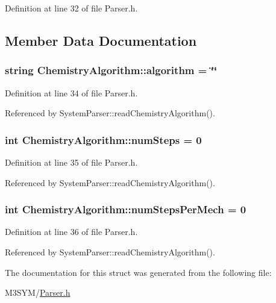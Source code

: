 Definition at line 32 of file Parser.\+h.



\subsection{Member Data Documentation}
\hypertarget{structChemistryAlgorithm_a79823d8025ebda7f40a0fa7683008ce2}{
\subsubsection[{algorithm}]{\setlength{\rightskip}{0pt plus 5cm}string Chemistry\+Algorithm\+::algorithm = \char`\"{}\char`\"{}}}\label{structChemistryAlgorithm_a79823d8025ebda7f40a0fa7683008ce2}


Definition at line 34 of file Parser.\+h.



Referenced by System\+Parser\+::read\+Chemistry\+Algorithm().

\hypertarget{structChemistryAlgorithm_a6ba1dded2edadb96427909fcead6cdeb}{
\subsubsection[{num\+Steps}]{\setlength{\rightskip}{0pt plus 5cm}int Chemistry\+Algorithm\+::num\+Steps = 0}}\label{structChemistryAlgorithm_a6ba1dded2edadb96427909fcead6cdeb}


Definition at line 35 of file Parser.\+h.



Referenced by System\+Parser\+::read\+Chemistry\+Algorithm().

\hypertarget{structChemistryAlgorithm_a8f1e4fb749816d74760c866b8beb0884}{
\subsubsection[{num\+Steps\+Per\+Mech}]{\setlength{\rightskip}{0pt plus 5cm}int Chemistry\+Algorithm\+::num\+Steps\+Per\+Mech = 0}}\label{structChemistryAlgorithm_a8f1e4fb749816d74760c866b8beb0884}


Definition at line 36 of file Parser.\+h.



Referenced by System\+Parser\+::read\+Chemistry\+Algorithm().



The documentation for this struct was generated from the following file\+:\begin{DoxyCompactItemize}
\item 
M3\+S\+Y\+M/\hyperlink{Parser_8h}{Parser.\+h}\end{DoxyCompactItemize}
